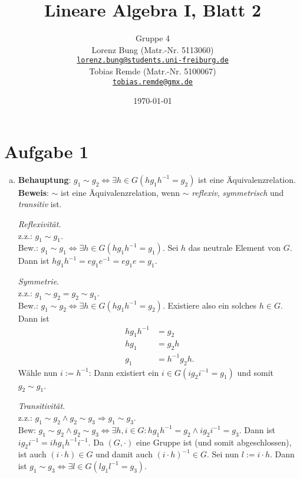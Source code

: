 \documentclass[12pt,a4paper]{article}
\title{Lineare Algebra I, Blatt 2}
\author{Gruppe 4\\
    Lorenz Bung (Matr.-Nr. 5113060)\\
    \href{mailto:lorenz.bung@students.uni-freiburg.de}{\texttt{lorenz.bung@students.uni-freiburg.de}}\\
    Tobias Remde (Matr.-Nr. 5100067)\\
    \href{mailto:tobias.remde@gmx.de}{\texttt{tobias.remde@gmx.de}}
}
\date{\today}
\begin{document}
\maketitle


\section*{Aufgabe 1}

\begin{enumerate}[(a)]
    \item \textbf{Behauptung}: $g_1 \sim g_2 \Leftrightarrow \exists h \in G (hg_1h^{-1} = g_2)$ ist eine Äquivalenzrelation.\\

    \textbf{Beweis}: $\sim$ ist eine Äquivalenzrelation, wenn $\sim$ \textit{reflexiv}, \textit{symmetrisch} und \textit{transitiv} ist.

    \textit{Reflexivität}.\\
    z.z.: $g_1 \sim g_1.$\\
    Bew.: $g_1 \sim g_1 \Leftrightarrow \exists h \in G (hg_1h^{-1} = g_1).$
    Sei $h$ das neutrale Element von $G$.
    Dann ist $hg_1h^{-1} = eg_1e^{-1} = eg_1e = g_1.$

    \textit{Symmetrie}.\\
    z.z.: $g_1 \sim g_2 = g_2 \sim g_1$.\\
    Bew.: $g_1 \sim g_2 \Leftrightarrow \exists h \in G (hg_1h^{-1} = g_2).$
    Existiere also ein solches $h \in G$.
    Dann ist \begin{align*}
        hg_1h^{-1} &= g_2\\
        hg_1 &= g_2h\\
        g_1 &= h^{-1}g_2h.
    \end{align*}
    Wähle nun $i := h^{-1}$: Dann existiert ein $i \in G (ig_2i^{-1} = g_1)$ und somit $g_2 \sim g_1$.

    \textit{Transitivität}.\\
    z.z.: $g_1 \sim g_2 \wedge g_2 \sim g_3 \Rightarrow g_1 \sim g_3$.\\
    Bew: $g_1 \sim g_2 \wedge g_2 \sim g_3 \Leftrightarrow \exists h,i \in G: hg_1h^{-1} = g_2 \wedge ig_2i^{-1} = g_3.$
    Dann ist $ig_2i^{-1} = ihg_1h^{-1}i^{-1}$.
    Da $(G, \cdot)$ eine Gruppe ist (und somit abgeschlossen), ist auch $(i \cdot h) \in G$ und damit auch $(i \cdot h)^{-1} \in G$.
    Sei nun $l := i \cdot h$.
    Dann ist $g_1 \sim g_3 \Leftrightarrow \exists l \in G (lg_1l^{-1} = g_3)$.


\end{enumerate}
\end{document}
